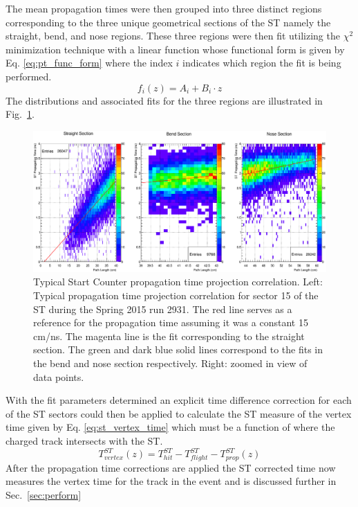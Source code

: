 The mean propagation times were then grouped into three distinct regions corresponding to the three unique geometrical sections of the ST namely the straight, bend, and nose regions.  These three regions were then fit utilizing the $\chi^{2}$ minimization technique with a linear function whose functional form is given by Eq. \ref{eq:pt_func_form} where the index $i$ indicates which region the fit is being performed.
	\begin{equation} \label{eq:pt_func_form}
		f_{i}(z) = A_{i} + B_{i} \cdot z
	\end{equation}
The distributions and associated fits for the three regions are illustrated in Fig.~\ref{fig:proptimeuncorrfits}.
	\begin{figure}[!htb]
		\centering
		\includegraphics[width=1.0\columnwidth]{calibration/figs/prop_time_uncorr_fits}
		\caption{Typical Start Counter propagation time projection correlation.  Left: Typical propagation time projection correlation for sector 15 of the ST during the Spring 2015 run 2931.  The red line serves as a reference for the propagation time assuming it was a constant 15 cm/ns.  The magenta line is the fit corresponding to the straight section.  The green and dark blue solid lines correspond to the fits in the bend and nose section respectively.  Right: zoomed in view of data points.}
		\label{fig:proptimeuncorrfits}
	\end{figure}
	
With the fit parameters determined an explicit time difference correction for each of the ST sectors could then be applied to calculate the ST measure of the vertex time given by Eq. \ref{eq:st_vertex_time} which must be a function of where the charged track intersects with the ST.
	\begin{equation}\label{eq:st_vertex_time}
	 	T^{ST}_{vertex}(z) = T^{ST}_{hit} - T^{ST}_{flight} - T^{ST}_{prop}(z)
	\end{equation} 
After the propagation time corrections are applied the ST corrected time now measures the vertex time for the track in the event and is discussed further in Sec.~\ref{sec:perform}

